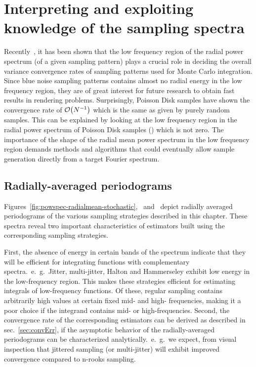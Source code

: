\documentclass[11pt,fleqn]{book} %
\begin{document}
%
%
%



%

%

\section{Interpreting and exploiting knowledge of the sampling spectra}

Recently~\cite{Pilleboue:2015:VAM}, it has been shown that the low frequency region of the
radial power spectrum (of a given sampling pattern) plays a crucial role in deciding the overall variance convergence rates of sampling 
patterns used for Monte Carlo integration. Since blue noise sampling patterns contains almost no radial 
energy in the low frequency region, they are of great interest for future research to obtain fast results in 
rendering problems. Surprisingly, Poisson Disk samples have shown the convergence rate of $\mathcal{O}\!\left(N^{-1}\right)$ which is the same as given by purely random samples. This can be explained by looking at the low frequency region in the radial power spectrum of Poisson Disk samples () which is not zero.
The importance of the shape of the radial mean power spectrum in the  low frequency region demands  methods and algorithms that could eventually allow sample generation directly from a target Fourier spectrum. 

\subsection{Radially-averaged periodograms}

Figures~\ref{fig:powspec-radialmean-stochastic},~ and~ depict radially averaged periodograms of the various sampling strategies described in this chapter. These spectra reveal two important characteristics of estimators built using the corresponding sampling strategies. 

First, the absence of energy in certain bands of the spectrum indicate that they will be efficient for integrating functions with complementary spectra.~e.~g.~Jitter, multi-jitter, Halton and Hammerseley exhibit low energy in the low-frequency region. This makes these strategies efficient for estimating integrals of low-frequency functions. Of these, regular sampling contains arbitrarily high values at certain fixed mid- and high- frequencies, making it a poor choice if the integrand contains mid- or high-frequencies. 
Second, the convergence rate of the corresponding estimators can be derived as described in sec.~\ref{sec:convErr}, if the asymptotic behavior of the radially-averaged periodograms can be characterized analytically.~e.~g.~we expect, from visual inspection that jittered sampling (or multi-jitter) will exhibit improved convergence compared to n-rooks sampling. 
\end{document}
